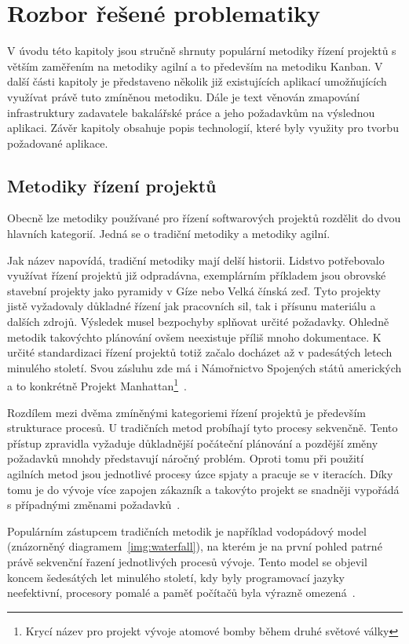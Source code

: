 \chapter{Rozbor řešené problematiky}
V úvodu této kapitoly jsou stručně shrnuty populární metodiky řízení projektů s větším zaměřením na metodiky agilní a to především na metodiku Kanban. V další části kapitoly je představeno několik již existujících aplikací umožňujících využívat právě tuto zmíněnou metodiku. Dále je text věnován zmapování infrastruktury zadavatele bakalářské práce a jeho požadavkům na výslednou aplikaci. Závěr kapitoly obsahuje popis technologií, které byly využity pro tvorbu požadované aplikace.

\section{Metodiky řízení projektů}
Obecně lze metodiky používané pro řízení softwarových projektů rozdělit do dvou hlavních kategorií. Jedná se o tradiční metodiky a metodiky agilní.

Jak název napovídá, tradiční metodiky mají delší historii. Lidstvo potřebovalo využívat řízení projektů již odpradávna, exemplárním příkladem jsou obrovské stavební projekty jako pyramidy v Gíze nebo Velká čínská zeď. Tyto projekty jistě vyžadovaly důkladné řízení jak pracovních sil, tak i přísunu materiálu a dalších zdrojů. Výsledek musel bezpochyby splňovat určité požadavky. Ohledně metodik takovýchto plánování ovšem neexistuje příliš mnoho dokumentace. K určité standardizaci řízení projektů totiž začalo docházet až v padesátých letech minulého století. Svou zásluhu zde má i Námořnictvo Spojených států amerických a to konkrétně Projekt Manhattan\footnote{Krycí název pro projekt vývoje atomové bomby během druhé světové války}~\cite{bib:project-managment-history}.

Rozdílem mezi dvěma zmíněnými kategoriemi řízení projektů je především strukturace procesů. U tradičních metod probíhají tyto procesy sekvenčně. Tento přístup zpravidla vyžaduje důkladnější počáteční plánování a pozdější změny požadavků mnohdy představují náročný problém. Oproti tomu při použití agilních metod jsou jednotlivé procesy úzce spjaty a pracuje se v iteracích. Díky tomu je do vývoje více zapojen zákazník a takovýto projekt se snadněji vypořádá s případnými změnami požadavků~\cite{bib:agile-vs-traditional}. 

Populárním zástupcem tradičních metodik je například vodopádový model (znázorněný diagramem~\ref{img:waterfall}), na kterém je na první pohled patrné právě sekvenční řazení jednotlivých procesů vývoje. Tento model se objevil koncem šedesátých let minulého století, kdy byly programovací jazyky neefektivní, procesory pomalé a paměť počítačů byla výrazně omezená~\cite{bib:agile-history}. 

